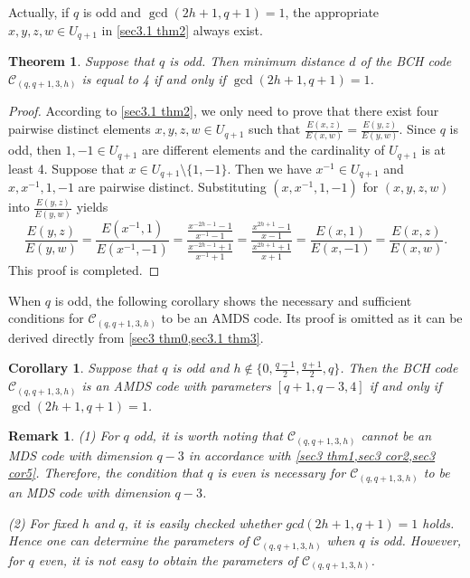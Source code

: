 \documentclass[10pt]{article}%
\newtheorem{theorem}{Theorem}%
\newtheorem{corollary}{Corollary}
\newtheorem{remark}{Remark}%
\begin{document}
	Actually, if $q$ is odd and $\gcd(2h+1,q+1)=1$, the appropriate $x,y,z,w\in U_{q+1}$ in \cref{sec3.1 thm2} always exist.
	\begin{theorem}\label{sec3.1 thm3}
		Suppose that $q$ is odd. Then minimum distance $d$ of the BCH code $\mathcal{C}_{(q,q+1,3,h)}$ is equal to 4 if and only if  $\gcd(2h+1,q+1)=1$.
	\end{theorem}
	\begin{proof}
		According to \cref{sec3.1 thm2}, we only need to prove that there exist four pairwise distinct elements $x,y,z,w\in U_{q+1}$ such that $\frac{E(x,z)}{E(x,w)}=\frac{E(y,z)}{E(y,w)}$. Since $q$ is odd, then $1,-1\in U_{q+1}$ are different elements and the cardinality of $U_{q+1}$ is at least 4. Suppose that $x\in U_{q+1}\setminus\{1,-1\}$. Then we have $x^{-1}\in U_{q+1}$ and $x,x^{-1},1,-1$ are pairwise distinct. Substituting $(x,x^{-1},1,-1)$ for $(x,y,z,w)$ into $\frac{E(y,z)}{E(y,w)}$ yields
		\begin{equation*}
			\frac{E(y,z)}{E(y,w)}=\frac{E(x^{-1},1)}{E(x^{-1},-1)}=\frac{\frac{x^{-2h-1}-1}{x^{-1}-1}}{\frac{x^{-2h-1}+1}{x^{-1}+1}}=\frac{\frac{x^{2h+1}-1}{x-1}}{\frac{x^{2h+1}+1}{x+1}}=\frac{E(x,1)}{E(x,-1)}=\frac{E(x,z)}{E(x,w)}.
		\end{equation*}
		This proof is completed.
	\end{proof}
	
	When $q$ is odd, the following corollary shows the necessary and sufficient conditions for $\mathcal{C}_{(q,q+1,3,h)}$ to be an AMDS code. Its proof is omitted as it can be derived directly from \cref{sec3 thm0,sec3.1 thm3}.
	\begin{corollary}\label{sec3 cor5}
		Suppose that $q$ is odd and $h\notin\{0,\frac{q-1}{2},\frac{q+1}{2},q\}$. Then the BCH code $\mathcal{C}_{(q,q+1,3,h)}$ is an AMDS code with parameters $[q+1,q-3,4]$ if and only if $\gcd(2h+1,q+1)=1$.
	\end{corollary}
	
	\begin{remark}\label{sec3 rmk2}
		(1) For $q$ odd, it is worth noting that $\mathcal{C}_{(q,q+1,3,h)}$ cannot be an MDS code with dimension $q-3$ in accordance with \cref{sec3 thm1,sec3 cor2,sec3 cor5}. Therefore, the condition that $q$ is even is necessary for $\mathcal{C}_{(q,q+1,3,h)}$ to be an MDS code with dimension $q-3$.
		
		(2) For fixed $h$ and $q$, it is easily checked whether $gcd(2h+1,q+1)=1$ holds. Hence one can determine the parameters of $\mathcal{C}_{(q,q+1,3,h)}$ when $q$ is odd. However, for $q$ even, it is not easy to obtain the parameters of $\mathcal{C}_{(q,q+1,3,h)}$.
	\end{remark}
	
\end{document}
